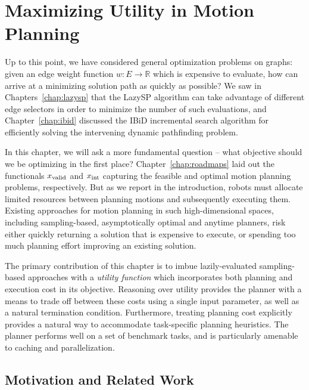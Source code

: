 \chapter{Maximizing Utility in Motion Planning}
\label{chap:utility}

Up to this point,
we have considered general optimization problems on graphs:
given an edge weight function $w : E \rightarrow \mathbb{R}$
which is expensive to evaluate,
how can arrive at a minimizing solution path as quickly as possible?
We saw in Chapters~\ref{chap:lazysp} that the LazySP algorithm
can take advantage of different edge selectors in order to minimize
the number of such evaluations,
and Chapter~\ref{chap:ibid} discussed the IBiD incremental search
algorithm for efficiently solving the intervening dynamic
pathfinding problem.

In this chapter,
we will ask a more fundamental question
-- what objective should we be optimizing in the first place?
Chapter~\ref{chap:roadmaps} laid out the functionals
$x_{\mbox{\scriptsize valid}}$ and $x_{\mbox{\scriptsize int}}$
capturing the feasible and optimal motion planning problems,
respectively.
But as we report in the introduction,
robots must allocate limited resources between planning
motions and subsequently executing them.
Existing approaches for motion planning in such high-dimensional
spaces,
including sampling-based, asymptotically optimal and anytime planners,
risk either quickly returning a solution that is expensive to execute,
or spending too much planning effort improving an existing solution.

The primary contribution of this chapter is to imbue 
lazily-evaluated sampling-based approaches
with a \emph{utility function}
which incorporates both planning and execution cost in its objective.
Reasoning over utility provides the planner
with a means to trade off between these costs using a single input
parameter,
as well as a natural termination condition.
Furthermore,
treating planning cost explicitly
provides a natural way to accommodate task-specific planning
heuristics.
The planner performs well on a set of benchmark tasks,
and is particularly amenable to caching
and parallelization.

\section{Motivation and Related Work}

